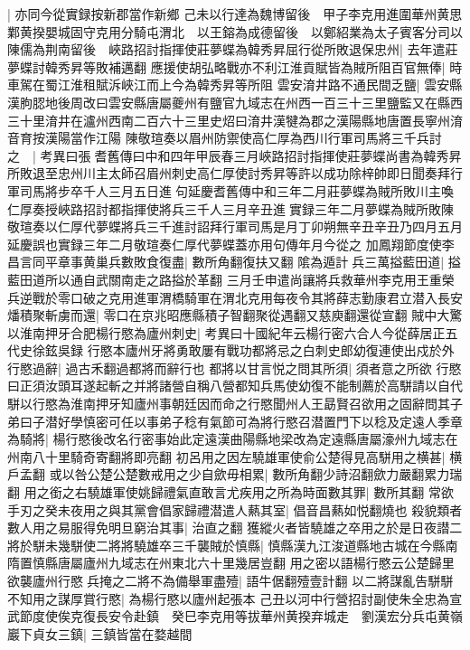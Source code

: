 |{
	亦同今從實録按新郡當作新鄉}
己未以行達為魏博留後　甲子李克用進圍華州黄思鄴黄揆嬰城固守克用分騎屯渭北　以王鎔為成德留後　以鄭紹業為太子賓客分司以陳儒為荆南留後　峽路招討指揮使莊夢蝶為韓秀昇屈行從所敗退保忠州|{
	去年遣莊夢蝶討韓秀昇等敗補邁翻}
應援使胡弘略戰亦不利江淮貢賦皆為賊所阻百官無俸|{
	時車駕在蜀江淮租賦泝峽江而上今為韓秀昇等所阻}
雲安淯井路不通民間乏鹽|{
	雲安縣漢朐䏰地後周改曰雲安縣唐屬夔州有鹽官九域志在州西一百三十三里鹽監又在縣西三十里淯井在瀘州西南二百六十三里史炤曰淯井漢犍為郡之漢陽縣地唐置長寧州淯音育按漢陽當作江陽}
陳敬瑄奏以眉州防禦使高仁厚為西川行軍司馬將三千兵討之　|{
	考異曰張耆舊傳曰中和四年甲辰春三月峽路招討指揮使莊夢蝶尚書為韓秀昇所敗退至忠州川主太師召眉州刺史高仁厚使討秀昇等許以成功除梓帥即日聞奏拜行軍司馬將步卒千人三月五日進句延慶耆舊傳中和三年二月莊夢蝶為賊所敗川主喚仁厚奏授峽路招討都指揮使將兵三千人三月辛丑進實録三年二月夢蝶為賊所敗陳敬瑄奏以仁厚代夢蝶將兵三千進討詔拜行軍司馬是月丁卯朔無辛丑辛丑乃四月五月延慶誤也實録三年二月敬瑄奏仁厚代夢蝶蓋亦用句傳年月今從之}
加鳳翔節度使李昌言同平章事黄巢兵數敗食復盡|{
	數所角翻復扶又翻}
隂為遁計兵三萬搤藍田道|{
	搤藍田道所以通自武關南走之路搤於革翻}
三月壬申遣尚讓將兵救華州李克用王重榮兵逆戰於零口破之克用進軍渭橋騎軍在渭北克用每夜令其將薛志勤康君立潜入長安燔積聚斬虜而還|{
	零口在京兆昭應縣積子智翻聚從遇翻又慈庾翻還從宣翻}
賊中大驚　以淮南押牙合肥楊行愍為廬州刺史|{
	考異曰十國紀年云楊行密六合人今從薛居正五代史徐鉉吳録}
行愍本廬州牙將勇敢屢有戰功都將忌之白刺史郎幼復連使出戍於外行愍過辭|{
	過古禾翻過都將而辭行也}
都將以甘言悦之問其所須|{
	須者意之所欲}
行愍曰正須汝頭耳遂起斬之并將諸營自稱八營都知兵馬使幼復不能制薦於高駢請以自代駢以行愍為淮南押牙知廬州事朝廷因而命之行愍聞州人王勗賢召欲用之固辭問其子弟曰子潜好學慎密可任以事弟子稔有氣節可為將行愍召潜置門下以稔及定遠人季章為騎將|{
	楊行愍後改名行密事始此定遠漢曲陽縣地梁改為定遠縣唐屬濠州九域志在州南八十里騎奇寄翻將即亮翻}
初呂用之因左驍雄軍使俞公楚得見高駢用之横甚|{
	横戶孟翻}
或以咎公楚公楚數戒用之少自歛毋相累|{
	數所角翻少詩沼翻歛力嚴翻累力瑞翻}
用之銜之右驍雄軍使姚歸禮氣直敢言尤疾用之所為時面數其罪|{
	數所其翻}
常欲手刃之癸未夜用之與其黨會倡家歸禮潜遣人爇其室|{
	倡音昌爇如悦翻燒也}
殺貌類者數人用之易服得免明旦窮治其事|{
	治直之翻}
獲縱火者皆驍雄之卒用之於是日夜譛二將於駢未幾駢使二將將驍雄卒三千襲賊於慎縣|{
	慎縣漢九江浚道縣地古城在今縣南隋置慎縣唐屬廬州九域志在州東北六十里幾居豈翻}
用之密以語楊行愍云公楚歸里欲襲廬州行愍兵掩之二將不為備舉軍盡殪|{
	語牛倨翻殪壹計翻}
以二將謀亂告駢駢不知用之謀厚賞行愍|{
	為楊行愍以廬州起張本}
己丑以河中行營招討副使朱全忠為宣武節度使俟克復長安令赴鎮　癸巳李克用等拔華州黄揆弃城走　劉漢宏分兵屯黄嶺巖下貞女三鎮|{
	三鎮皆當在婺越間}
